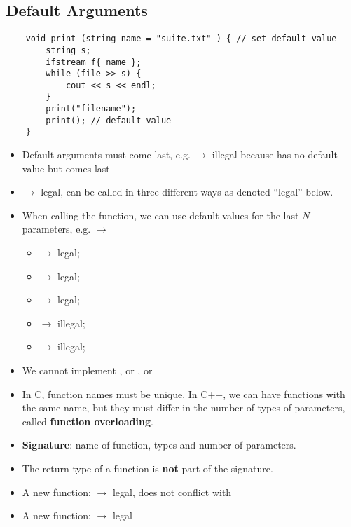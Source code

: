 \subsection{Default Arguments}
\begin{lstlisting}
    void print (string name = "suite.txt" ) { // set default value
        string s;
        ifstream f{ name };
        while (file >> s) {
            cout << s << endl;
        }
        print("filename");
        print(); // default value
    }
\end{lstlisting}
\begin{itemize}
      \item Default arguments must come last, e.g. 
            $ \rightarrow $  illegal because  has no default value but comes last
      \item {} $ \rightarrow $ legal,
            can be called in three different ways as denoted ``legal'' below.
      \item When calling the function, we can use default values for the last
            $ N $ parameters, e.g. $ \rightarrow $
            \begin{itemize}
                  \item {} $ \rightarrow $ legal;
                  \item {} $ \rightarrow $ legal;
                  \item {} $ \rightarrow $ legal;
                  \item {} $ \rightarrow $ illegal;
                  \item {} $ \rightarrow $ illegal;
            \end{itemize}
      \item We cannot implement , or , or
      \item In C, function names must be unique. In C++, we can have functions with
            the same name, but they must differ in the number of types of parameters,
            called \textbf{function overloading}.
      \item \textbf{Signature}: name of function, types and number of parameters.
      \item The return type of a function is \textbf{not} part of the signature.
      \item A new function:  $ \rightarrow $ legal,
            does not conflict with 
      \item A new function:  $ \rightarrow $ legal
\end{itemize}

